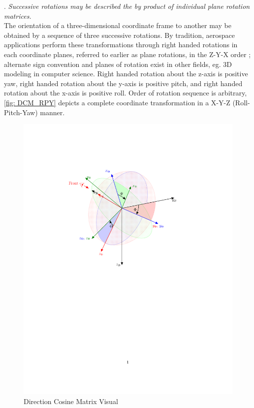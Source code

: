 \documentclass[12pt]{ucthesis}
\begin{document}
. \textit{Successive rotations may be described the by product of individual plane rotation matrices.} \\
\indent The orientation of a three-dimensional coordinate frame to another may be obtained by a sequence of three successive rotations. By tradition, aerospace applications perform these transformations through right handed rotations in each coordinate planes, referred to earlier as plane rotations, in the Z-Y-X order \citet{Stevens2003}; alternate sign convention and planes of rotation exist in other fields, eg. 3D modeling in computer science. Right handed rotation about the z-axis is positive yaw, right handed rotation about the y-axis is positive pitch, and right handed rotation about the x-axis is positive roll. Order of rotation sequence is arbitrary, \autoref{fig: DCM_RPY} depicts a complete coordinate transformation in a X-Y-Z (Roll-Pitch-Yaw) manner.
%
	\begin{figure}[htb]
		\centering
		\includegraphics[clip=true, viewport=1in 5in 7in 9.25in,scale=.8]{figs/fig_dcm.pdf}%
		\caption{Direction Cosine Matrix Visual}%
		\label{fig: DCM_RPY}%
	\end{figure}
\end{document}
